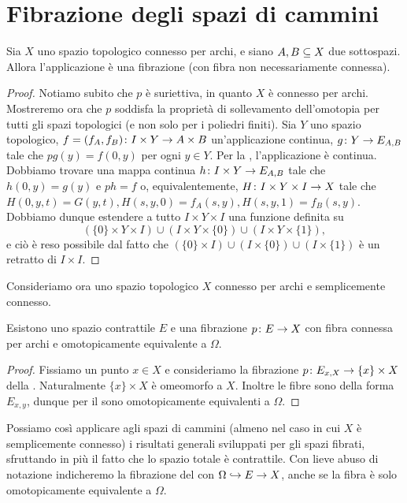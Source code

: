 \section{Fibrazione degli spazi di cammini}
\begin{proposition}
Sia $X$ uno spazio topologico connesso per archi, e siano $A,B\subseteq X$ due sottospazi. Allora l'applicazione
è una fibrazione (con fibra non necessariamente connessa).
\end{proposition}
\begin{proof}
Notiamo subito che $p$ è suriettiva, in quanto $X$ è connesso per archi. Mostreremo ora che $p$ soddisfa la proprietà di sollevamento dell'omotopia per tutti gli spazi topologici (e non solo per i poliedri finiti). Sia $Y$ uno spazio topologico, $f=(f_A,f_B)\colon I\times Y\to A\times B$ un'applicazione continua, $g\colon Y\to E_{A,B}$ tale che $pg(y)=f(0,y)$ per ogni $y\in Y$. Per la , l'applicazione
è continua. Dobbiamo trovare una mappa continua $h\colon I\times Y\to E_{A,B}$ tale che $h(0,y)=g(y)$ e $ph=f$ o, equivalentemente, $H\colon I\times Y\times I\to X$ tale che $H(0,y,t)=G(y,t),H(s,y,0)=f_A(s,y),H(s,y,1)=f_B(s,y)$. Dobbiamo dunque estendere a tutto $I\times Y\times I$ una funzione definita su
$$
(\{0\}\times Y\times I)\cup(I\times Y\times \{0\})\cup(I\times Y\times \{1\}),
$$
e ciò è reso possibile dal fatto che $(\{0\}\times I)\cup(I\times\{0\})\cup(I\times\{1\})$ è un retratto di $I\times I$.
\end{proof}

Consideriamo ora uno spazio topologico $X$ connesso per archi e semplicemente connesso.

\begin{corollary}
Esistono uno spazio contrattile $E$ e una fibrazione $p\colon E\to X$ con fibra connessa per archi e omotopicamente equivalente a $\Omega$.
\end{corollary}
\begin{proof}
Fissiamo un punto $x\in X$ e consideriamo la fibrazione $p\colon E_{x,X}\to\{x\}\times X$ della . Naturalmente $\{x\}\times X$ è omeomorfo a $X$. Inoltre le fibre sono della forma $E_{x,y}$, dunque per il  sono omotopicamente equivalenti a $\Omega$.
\end{proof}

Possiamo così applicare agli spazi di cammini (almeno nel caso in cui $X$ è semplicemente connesso) i risultati generali sviluppati per gli spazi fibrati, sfruttando in più il fatto che lo spazio totale è contrattile. Con lieve abuso di notazione indicheremo la fibrazione del  con $\Omega\hookrightarrow E\to X$, anche se la fibra è solo omotopicamente equivalente a $\Omega$.

